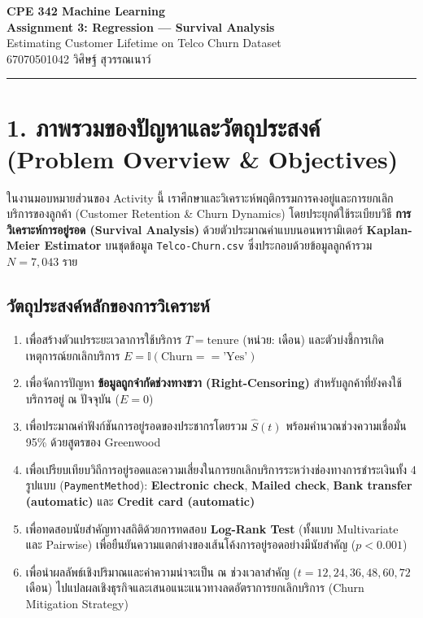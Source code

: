 \documentclass[12pt,a4paper]{article}
\begin{document}
\begin{center}
    {\Large\textbf{CPE 342 Machine Learning}}\\[2pt]
    {\Large\textbf{Assignment 3: Regression — Survival Analysis}}\\[4pt]
    {\large Estimating Customer Lifetime on Telco Churn Dataset}\\[6pt]
    \textcolor{accentblue}{67070501042 วิศิษฐ์ สุวรรณเนาว์}
\end{center}

\noindent\rule{\textwidth}{0.4pt}\vspace{4pt}

\section*{1. ภาพรวมของปัญหาและวัตถุประสงค์\\ \large(Problem Overview \& Objectives)}

ในงานมอบหมายส่วนของ Activity นี้ เราศึกษาและวิเคราะห์พฤติกรรมการคงอยู่และการยกเลิกบริการของลูกค้า (Customer Retention \& Churn Dynamics) โดยประยุกต์ใช้ระเบียบวิธี \textbf{การวิเคราะห์การอยู่รอด (Survival Analysis)} ด้วยตัวประมาณค่าแบบนอนพารามิเตอร์ \textbf{Kaplan-Meier Estimator} บนชุดข้อมูล \texttt{Telco-Churn.csv} ซึ่งประกอบด้วยข้อมูลลูกค้ารวม $N = 7,043$ ราย

\subsection*{วัตถุประสงค์หลักของการวิเคราะห์}
\begin{enumerate}[leftmargin=18pt, itemsep=2pt]
    \item เพื่อสร้างตัวแปรระยะเวลาการใช้บริการ $T = \text{tenure}$ (หน่วย: เดือน) และตัวบ่งชี้การเกิดเหตุการณ์ยกเลิกบริการ $E = \mathbb{I}(\text{Churn} == \text{'Yes'})$
    \item เพื่อจัดการปัญหา \textbf{ข้อมูลถูกจำกัดช่วงทางขวา (Right-Censoring)} สำหรับลูกค้าที่ยังคงใช้บริการอยู่ ณ ปัจจุบัน ($E = 0$)
    \item เพื่อประมาณค่าฟังก์ชันการอยู่รอดของประชากรโดยรวม $\hat{S}(t)$ พร้อมคำนวณช่วงความเชื่อมั่น 95\% ด้วยสูตรของ Greenwood
    \item เพื่อเปรียบเทียบวิถีการอยู่รอดและความเสี่ยงในการยกเลิกบริการระหว่างช่องทางการชำระเงินทั้ง 4 รูปแบบ (\texttt{PaymentMethod}): \textbf{Electronic check}, \textbf{Mailed check}, \textbf{Bank transfer (automatic)} และ \textbf{Credit card (automatic)}
    \item เพื่อทดสอบนัยสำคัญทางสถิติด้วยการทดสอบ \textbf{Log-Rank Test} (ทั้งแบบ Multivariate และ Pairwise) เพื่อยืนยันความแตกต่างของเส้นโค้งการอยู่รอดอย่างมีนัยสำคัญ ($p < 0.001$)
    \item เพื่อนำผลลัพธ์เชิงปริมาณและค่าความน่าจะเป็น ณ ช่วงเวลาสำคัญ ($t = 12, 24, 36, 48, 60, 72$ เดือน) ไปแปลผลเชิงธุรกิจและเสนอแนะแนวทางลดอัตราการยกเลิกบริการ (Churn Mitigation Strategy)
\end{enumerate}
\end{document}
